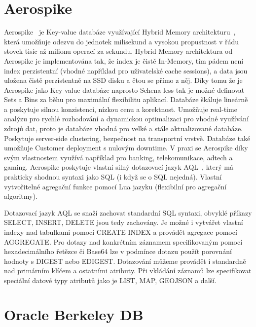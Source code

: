 \documentclass[czech,master,dept460,male,csharp,cpdeclaration]{diploma}
\begin{document}
	\section{Aerospike} \label{lab-aerospike}
	
	Aerospike~\cite{aerospike} je Key-value databáze využívající Hybrid Memory architekturu~\cite{hybmem-arch}, která umožňuje odezvu do jednotek milisekund a vysokou propustnost v řádu stovek tisíc až milionu operací za sekundu. Hybrid Memory architektura od Aerospike je implementována tak, že index je čistě In-Memory, tím pádem není index perzistentní (vhodné například pro uživatelské cache sessions), a data jsou uložena čistě perzistentně na SSD disku a čtou se přímo z něj. Díky tomu že je Aerospike jako Key-value databáze naprosto Schena-less tak je možné definovat Sets a Bins za běhu pro maximální flexibilitu aplikací. Databáze škáluje lineárně a poskytuje silnou konzistenci, nízkou cenu a korektnost. Umožňuje real-time analýzu pro rychlé rozhodování a dynamickou optimalizaci pro vhodné využívání zdrojů dat, proto je databáze vhodná pro velké a stále aktualizované databáze. Poskytuje server-side clustering, bezpečnost na transportní vrstvě. Databáze také umožňuje Customer deployment s nulovým downtime. V praxi se Aerospike díky svým vlastnostem využívá například pro banking, telekomunikace, adtech a gaming. Aerospike poskytuje vlastní silný dotazovací jazyk AQL~\cite{aql}, který má prakticky shodnou syntaxi jako SQL (i když se o SQL nejedná). Vlastní vytvořitelné agregační funkce pomocí Lua jazyku (flexibilní pro agregační algoritmy).
	
	Dotazovací jazyk AQL se snaží zachovat standardní SQL syntaxi, obvyklé příkazy SELECT, INSERT, DELETE jsou tedy zachovány. Je možné i vytvářet vlastní indexy nad tabulkami pomocí CREATE INDEX a provádět agregace pomocí AGGREGATE. Pro dotazy nad konkrétním záznamem specifikovaným pomocí hexadecimálního řetězce či Base64 lze v podmínce dotazu použít porovnání hodnoty s DIGEST nebo EDIGEST. Dotazování můžeme provádět i standardně nad primárním klíčem a ostatními atributy. Při vkládání záznamů lze specifikovat speciální datové typy atributů jako je LIST, MAP, GEOJSON a další.
	
	\section{Oracle Berkeley DB}
	
\end{document}
